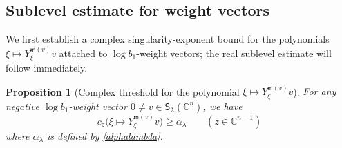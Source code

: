 \documentclass[reqno,11pt]{amsart}
\numberwithin{equation}{section}
\newtheorem{proposition}[theorem]{Proposition}
\theoremstyle{definition}
\theoremstyle{remark}
\begin{document}
\subsection{Sublevel estimate for weight vectors}
\label{s:critical-weight-vector}

We first establish a complex singularity-exponent bound for the polynomials $\xi\mapsto Y_\xi^{\mathsf m(v)} v$ attached to $\log b_1$-weight vectors; the real
sublevel estimate will follow immediately.

\begin{proposition}[Complex threshold for the polynomial $\xi\mapsto Y_\xi^{\mathsf m(v)} v$]
\label{prop:critical-weight-complex-threshold}
For any negative $\log b_1$-weight vector $0\ne v\in{\mathsf S}_\lambda(\mathbb C^n)$, we have
\begin{equation}\label{eq:critical-complex-threshold}
c_z\bigl(\xi\mapsto Y_\xi^{\mathsf m(v)} v\bigr)\ge\alpha_{\lambda}
\qquad(z\in\mathbb C^{n-1})
\end{equation}
where $\alpha_\lambda$ is defined by \eqref{alphalambda}.
\end{proposition}
\end{document}
